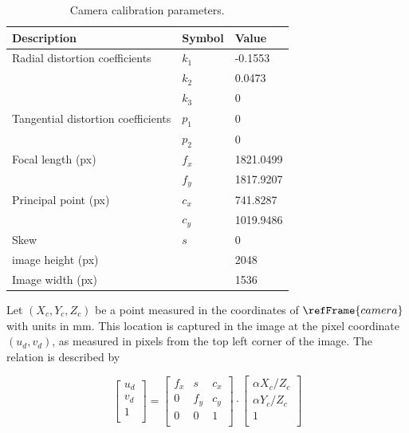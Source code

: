 \begin{table}[!h]
    \centering
    \begin{tabular}{lll}
        \hline
        Description & Symbol & Value\\
        \hline
                Radial distortion coefficients
                & $k_1$ & -0.1553\\
                & $k_2$ & 0.0473\\
                & $k_3$ & 0\\
                Tangential distortion coefficients
                & $p_1$ & 0\\
                & $p_2$ & 0\\
                Focal length (px)
                & $f_x$ & 1821.0499\\
                & $f_y$ & 1817.9207\\
                Principal point (px)
                & $c_x$ & 741.8287\\
                & $c_y$ & 1019.9486\\
                Skew
                & $s$ & 0\\
                image height (px)
                & & 2048\\
                Image width (px)
                & & 1536\\
        \hline
        \end{tabular}
    \caption{Camera calibration parameters.}
    \label{tb:CameraParams}
\end{table}

Let $(X_c, Y_c, Z_c)$ be a point measured in the coordinates of $\refFrame{camera}$ with units in mm. This location is captured in the image at the pixel coordinate $(u_d,v_d)$, as measured in pixels from the top left corner of the image. The relation is described by

\begin{equation}
    \begin{bmatrix}
        u_d\\
        v_d\\
        1\\
    \end{bmatrix}
    =
    \begin{bmatrix}
        f_x & s & c_x\\
        0 & f_y & c_y\\
        0 & 0 & 1\\
    \end{bmatrix}
    \cdot
    \begin{bmatrix}
        \alpha X_c/Z_c\\
        \alpha Y_c/Z_c\\
        1\\
    \end{bmatrix}
\end{equation}

